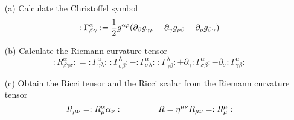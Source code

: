\begin{itemize}

\item[(a)] Calculate the Christoffel symbol
\begin{equation}
\label{christoffel_symbol}
:\Gamma ^\alpha _{\beta \gamma}: = 
\dfrac{1}{2} g^{\alpha \rho} \qty(
\partial_\beta g_{\gamma \rho} + 
\partial_\gamma g_{\rho \beta} -
\partial_\rho g_{\beta \gamma}
)
\end{equation}

\item[(b)] Calculate the Riemann curvature tensor
\begin{equation}
\label{riemann_tensor}
: R^\alpha _{\beta \gamma \sigma}:
=
:\Gamma ^\alpha _{\gamma \lambda}:\,
:\Gamma ^\lambda _{\sigma \beta}:
-
:\Gamma ^\alpha _{\sigma \lambda}:\,
:\Gamma ^\lambda _{\gamma \beta}:
+
\partial_\gamma :\Gamma^\alpha _{\sigma \beta}: 
-
\partial_\sigma :\Gamma^\alpha _{\gamma \beta} :
\end{equation}

\item[(c)] Obtain the Ricci tensor and the Ricci scalar from the Riemann curvature tensor
\begin{equation}
\label{ricci}
R_{\mu \nu} = :R^\alpha _\mu \alpha _\nu: \hspace{1.5cm}
R=\eta^{\mu \nu} R_{\mu \nu} = :R^{\mu} _\mu:
\end{equation}

\end{itemize}

